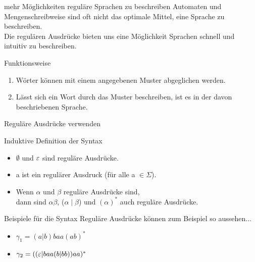 \begin{frame}[fragile]{mehr Möglichkeiten reguläre Sprachen zu beschreiben}
    Automaten und Mengenschreibweise sind oft nicht das optimale Mittel, eine Sprache zu beschreiben.\\
    Die \alert{regulären Ausdrücke} bieten uns eine Möglichkeit Sprachen schnell und intuitiv zu beschreiben.
    \begin{alertblock}{Funktionsweise}
        \begin{enumerate}
            \item Wörter können mit einem angegebenen Muster abgeglichen werden.
            \item Lässt sich ein Wort durch das Muster beschreiben, ist es in der davon beschriebenen Sprache.
        \end{enumerate}
    \end{alertblock}
\end{frame}

\begin{frame}{Reguläre Ausdrücke verwenden}
    \begin{alertblock}{Induktive Definition der Syntax}
        \begin{itemize}
            \item \alert{$\emptyset$} und \alert{$\varepsilon$} sind reguläre Ausdrücke.
            \item \alert{a} ist ein regulärer Ausdruck (für alle a $\in \Sigma$).
            \item Wenn \alert{$\alpha$} und \alert{$\beta$} reguläre Ausdrücke sind,\\dann sind \alert{$\alpha \beta$}, \alert{($\alpha \mid \beta$)} und \alert{$(\alpha)^*$} auch reguläre Ausdrücke.
        \end{itemize}
    \end{alertblock}
    \begin{exampleblock}{Beispiele für die Syntax}
        Reguläre Ausdrücke können zum Beispiel so aussehen...
        \begin{itemize}

            \item $\gamma_1 = (a | b) baa (ab)^*$
            \item $\gamma_2 = ((\varepsilon | baa (b | bb)) aa)^*$
        \end{itemize}
    \end{exampleblock}
\end{frame}

